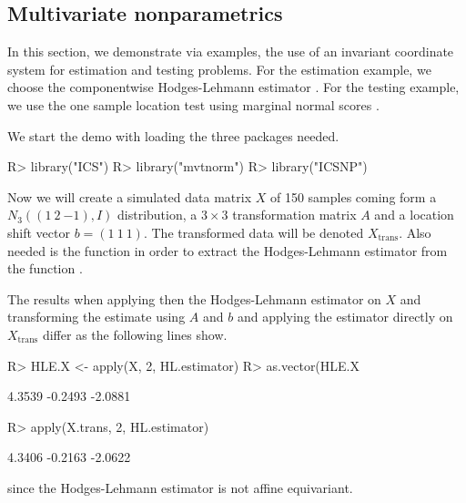 \documentclass[article,nojss]{jss}
\begin{document}
\subsection{Multivariate nonparametrics}\label{EXnp}

In this section, we demonstrate via examples, the use of an invariant coordinate system for estimation and testing problems. For the
estimation example, we choose the componentwise Hodges-Lehmann estimator \citep{HettmanspergerMcKean1998}. For the testing example,
we use the one sample location test using marginal normal scores \citep{PuriSen1971}.

We start the demo with loading the three packages needed.
\begin{Schunk}
\begin{Sinput}
R> library("ICS")
R> library("mvtnorm")
R> library("ICSNP")
\end{Sinput}
\end{Schunk}
Now we will create a simulated data matrix $X$ of 150 samples coming form a $N_{3}((1 \ 2 \ {-1}),I)$ distribution,
a $3 \times 3$ transformation matrix $A$ and a location shift vector $b=(1 \ 1 \ 1)$. The transformed data will be denoted
$X_\mathrm{trans}$. %
Also needed is the function  in order to extract the Hodges-Lehmann estimator from the
function .
\begin{Schunk}
\end{Schunk}

The results when applying then the Hodges-Lehmann estimator on $X$ and transforming the estimate using $A$ and $b$ and
applying the estimator directly on $X_\mathrm{trans}$ differ as the following lines show.
\begin{Schunk}
\begin{Sinput}
R> HLE.X <- apply(X, 2, HL.estimator)
R> as.vector(HLE.X %
\end{Sinput}
\begin{Soutput}
[1]  4.3539 -0.2493 -2.0881
\end{Soutput}
\begin{Sinput}
R> apply(X.trans, 2, HL.estimator)
\end{Sinput}
\begin{Soutput}
[1]  4.3406 -0.2163 -2.0622
\end{Soutput}
\end{Schunk}
since the Hodges-Lehmann estimator is not affine equivariant.
\end{document}
